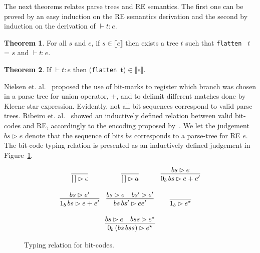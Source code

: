 \documentclass[review]{elsarticle}
\newcommand{\sembrackets}[1]{\ensuremath{\llbracket #1 \rrbracket}}
\theoremstyle{definition}
\newtheorem{Theorem}{Theorem}
\begin{document}
The next theorems relates parse trees and RE semantics.
The first one can be proved by an easy induction on the RE semantics derivation 
and the second by induction on the derivation of $\vdash t : e$.

\begin{Theorem}\label{theorem:semanticstypingflatten}
   For all $s$ and $e$, if $s \in \sembrackets{e}$ then exists a tree $t$
   such that \texttt{flatten } $t$ = $s$ and $\vdash t : e$.
\end{Theorem}

\begin{Theorem}\label{theorem:typingflattensemantics}
If $\vdash t : e$ then (\texttt{flatten }t)$\in\sembrackets{e}$. 
\end{Theorem}

Nielsen et. al.~\cite{Lasse2011} proposed the
use of bit-marks to register which branch was chosen in a parse tree for union
operator, $+$, and to delimit different matches done by Kleene star expression.
Evidently, not all bit sequences correspond to valid parse trees. Ribeiro et. al.~\cite{Ribeiro2017}
showed an inductively defined relation between valid bit-codes and RE, accordingly to the encoding
proposed by~\cite{Lasse2011}. We let the judgement $bs \rhd e$ denote that the sequence of bits
$bs$ corresponds to a parse-tree for RE $e$. The bit-code typing relation is
presented as an inductively defined judgement in Figure~\ref{figure:typing-bitcodes}.

\begin{figure}[h]
	\[
	\begin{array}{ccc}
	\infer{[\,] \rhd \epsilon}{} &
	\infer{[\,] \rhd a}{}  &
	\infer{0_b\, bs \rhd e + e'}{bs \rhd e} \\ \\
	\infer{1_b\,bs \rhd e + e'}{bs \rhd e'} &
	\infer{bs\,bs' \rhd e e'}{bs \rhd e & bs' \rhd e'} &
	\infer{ 1_b \rhd e^\star}{} \\ \\
	\multicolumn{3}{c}{
		\infer{0_b\,(bs\,bss) \rhd e^\star}{bs \rhd e & bss \rhd e^\star}
	}
	\end{array}
	\]
	\centering
	\caption{Typing relation for bit-codes.}
	\label{figure:typing-bitcodes}
\end{figure}
\end{document}
